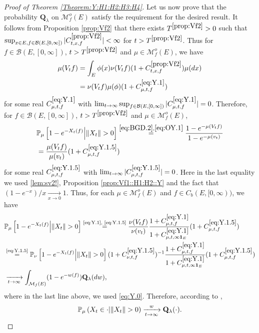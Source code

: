 \documentclass[12pt,a4paper]{amsart}
\numberwithin{equation}{section}
\theoremstyle{plain}
\theoremstyle{definition}
\theoremstyle{remark}
\begin{document}
\begin{proof}[Proof of Theorem \ref{Theorem:Y:H1:H2:H3:H4}]
	Let us now prove that the probability $\mathbf Q_\lambda$ on $\mathcal M_f^o(E)$ satisfy the requirement for the desired result. 
	It follows from Proposition \ref{prop:Vf2} that there exists $T^{\ref{prop:Vf2}}>0$ such that $\sup_{x\in E, f \in \mathcal B(E,[0,\infty])} |C^{\ref{prop:Vf2}}_{t,x,f}|< \infty$ for $t>T^{\ref{prop:Vf2}}$.
	Thus for $f \in \mathcal B(E,[0,\infty])$, $t>T^{\ref{prop:Vf2}}$ and $\mu \in \mathcal M_f^o(E)$, we have
\begin{align}
	\mu(V_tf)
	&= \int_E  \phi(x) \nu (V_tf) (1+C^{\ref{prop:Vf2}}_{t,x,f})\mu(dx)
	\\ \label{eq:Y.1} & = \nu(V_tf) \mu(\phi)(1+ C^{\eqref{eq:Y.1}}_{\mu,t,f})
\end{align}
	for some real $C^{\eqref{eq:Y.1}}_{\mu,t,f}$ with
	$\lim_{t\to \infty} \sup_{f \in \mathcal B(E,[0,\infty])}
	|C^{\eqref{eq:Y.1}}_{\mu,t,f}| = 0$.
	Therefore, for $f\in \mathcal B(E,[0,\infty])$,
	$t > T^{\ref{prop:Vf2}}$ and $\mu \in \mathcal M_f^o(E)$,
\begin{align}
	&\mathbb P_\mu \left[1 - e^{-X_t(f)} \middle|\|X_t\|>0\right]
	\overset{\eqref{eq:BGD.2},\eqref{eq:OY.1}}= \frac{1 - e^{- \mu(V_tf)}} {1 - e^{-\mu(v_t)}}
	\\\label{eq:Y.1.5}& = \frac{ \mu(V_t f) }{ \mu(v_t) } (1+C^{\eqref{eq:Y.1.5}}_{\mu,t,f})
\end{align}
	for some real $C^{\eqref{eq:Y.1.5}}_{\mu,t,f}$ with $\lim_{t\to \infty} |C^{\eqref{eq:Y.1.5}}_{\mu,t,f}| = 0$.
	Here in the last equality we used \eqref{lem:sv2!}, Proposition \ref{prop:Vf1::H1:H2::Y} and the fact that $(1-e^{-x})/x \xrightarrow[x\to 0]{}1$.
	Thus, for each $\mu \in \mathcal M^o_f(E)$ and $f\in C_b(E,[0,\infty))$, we have
\begin{align}
	&\mathbb P_\mu \left[1 - e^{-X_t(f)} \middle|\|X_t\|>0\right]
	 \overset{\text{\eqref{eq:Y.1}, \eqref{eq:Y.1.5}}}= \frac{ \nu(V_tf) }{ \nu(v_t) } \frac{1+C^{\eqref{eq:Y.1}}_{\mu,t,f}}{1+C^{\eqref{eq:Y.1}}_{\mu, t,\infty \mathbf 1_E}}(1+ C^{\eqref{eq:Y.1.5}}_{\mu,t,f})
	\\& \overset{\text{\eqref{eq:Y.1.5}}}= \mathbb P_\nu \left[1 - e^{-X_t(f)} \middle| \|X_t\|>0\right](1+C^{\eqref{eq:Y.1.5}}_{\nu, t,f})^{-1}  \frac{1+C^{\eqref{eq:Y.1}}_{\mu,t,f}}{1+C^{\eqref{eq:Y.1}}_{\mu,  t,\infty \mathbf 1_E}}(1+ C^{\eqref{eq:Y.1.5}}_{\mu,t,f})
	\\&\xrightarrow[t\to \infty]{} \int_{\mathcal M_f(E)}(1-e^{-w(f)}) \mathbf Q_\lambda(dw),
\end{align}
	where in the last line above, we used \eqref{eq:Y.0}.
	Therefore, according to \cite[Theorem 1.18]{Li2011MeasureValued},
	\[\mathbb P_\mu\left(X_t \in \cdot \middle| \|X_t\|>0\right)
	\xrightarrow[t\to \infty]{w}
	\mathbf Q_\lambda(\cdot). \qedhere\]
\end{proof}
\end{document}
